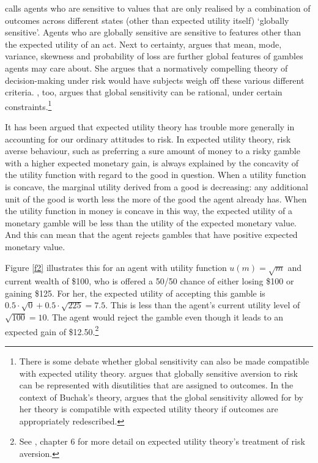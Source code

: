 \citet{Buchak2013} calls agents who are sensitive to values that are only realised by a combination of outcomes across different states (other than expected utility itself) `globally sensitive'. Agents who are globally sensitive are sensitive to features other than the expected utility of an act. Next to certainty, \citet{Lopes1981, Lopes1996} argues that mean, mode, variance, skewness and probability of loss are further global features of gambles agents may care about. She argues that a normatively compelling theory of decision-making under risk would have subjects weigh off these various different criteria. \citet{Buchak2013}, too, argues that global sensitivity can be rational, under certain constraints.\footnote{There is some debate whether global sensitivity can also be made compatible with expected utility theory. \citet{Weirich1986} argues that globally sensitive aversion to risk can be represented with disutilities that are assigned to outcomes. In the context of Buchak's theory, \citet{Pettigrew2014} argues that the global sensitivity allowed for by her theory is compatible with expected utility theory if outcomes are appropriately redescribed.}

It has been argued that expected utility theory has trouble more generally in accounting for our ordinary attitudes to risk. In expected utility theory, risk averse behaviour, such as preferring a sure amount of money to a risky gamble with a higher expected monetary gain, is always explained by the concavity of the utility function with regard to the good in question. When a utility function is concave, the marginal utility derived from a good is decreasing: any additional unit of the good is worth less the more of the good the agent already has. When the utility function in money is concave in this way, the expected utility of a monetary gamble will be less than the utility of the expected monetary value. And this can mean that the agent rejects gambles that have positive expected monetary value.

Figure \ref{f2} illustrates this for an agent with utility function $u(m) = \sqrt{m}$ and current wealth of \$100, who is offered a 50/50 chance of either losing \$100 or gaining \$125. For her, the expected utility of accepting this gamble is $0.5 \cdot \sqrt{0} + 0.5 \cdot \sqrt{225} = 7.5$. This is less than the agent's current utility level of $\sqrt{100} = 10$. The agent would reject the gamble even though it leads to an expected gain of \$12.50.\footnote{See \citet{Mas-Colell1995}, chapter 6 for more detail on expected utility theory's treatment of risk aversion.}

